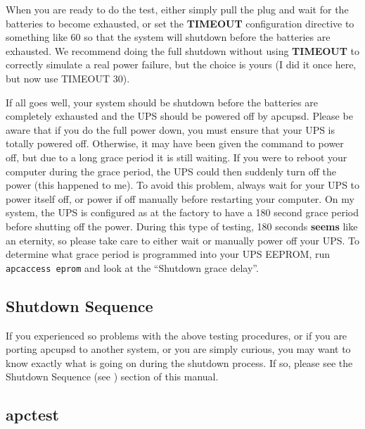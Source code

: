 {{When you are ready to do the test, either simply pull the plug and wait for
the batteries to become exhausted, or set the {\bf TIMEOUT} configuration
directive to something like 60 so that the system will shutdown before the
batteries are exhausted. We recommend doing the full shutdown without using
{\bf TIMEOUT} to correctly simulate a real power failure, but the choice is
yours (I did it once here, but now use TIMEOUT 30).  

If all goes well, your system should be shutdown before the batteries are
completely exhausted and the UPS should be powered off by apcupsd. Please be
aware that if you do the full power down, you must ensure that your UPS is
totally powered off.  Otherwise, it may have been given the command to power
off, but due to a long grace period it is still waiting. If you were to reboot
your computer during the grace period, the UPS could then suddenly turn off
the power (this happened to me). To avoid this problem, always wait for your
UPS to power itself off, or power if off manually before restarting your
computer. On my system, the UPS is configured as at the factory to have a 180
second grace period before shutting off the power. During this type of
testing, 180 seconds {\bf seems} like an eternity, so please take care to
either wait or manually power off your UPS. To determine what grace period is
programmed into your UPS EEPROM, run {\tt apcaccess eprom} and look at the
``Shutdown grace delay''. 

\label{Shutdown-Sequence}

\subsection*{Shutdown Sequence}

\label{index-Shutdown-Sequence-99}
If you experienced so problems with the above testing procedures, or if you
are porting apcupsd to another system, or you are simply curious, you may want
to know exactly what is going on during the shutdown process. If so, please
see the Shutdown Sequence (see 
) section of this
manual. 

\label{apctest}

\subsection*{apctest}

}}
